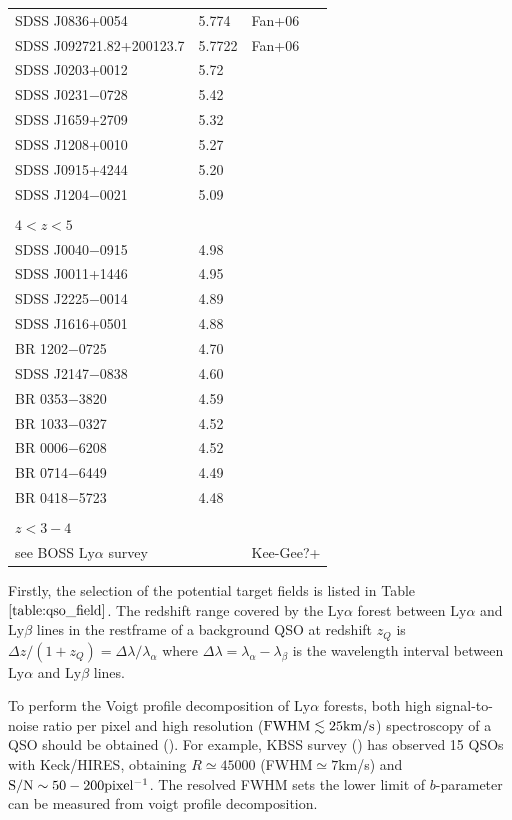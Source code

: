 \documentclass[useAMS,usenatbib,twocolumn]{mn2e}
\newcommand{\LyA}{\mbox{Ly}\alpha}
\begin{document}
\begin{table}
\begin{tabular}{lll}
SDSS J0836+0054                   &  5.774        & Fan+06  \\
SDSS J092721.82+200123.7          &  5.7722       & Fan+06  \\
SDSS J0203+0012  & 5.72 \\
SDSS J0231−0728  & 5.42 \\ 
SDSS J1659+2709  & 5.32 \\
SDSS J1208+0010  & 5.27 \\
SDSS J0915+4244  & 5.20 \\
SDSS J1204−0021  & 5.09 \\
\\
$4<z<5$ \\
SDSS J0040−0915  & 4.98\\
SDSS J0011+1446  & 4.95\\
SDSS J2225−0014  & 4.89\\
SDSS J1616+0501  & 4.88\\
BR 1202−0725     & 4.70\\
SDSS J2147−0838  & 4.60\\
BR 0353−3820     & 4.59\\
BR 1033−0327     & 4.52\\
BR 0006−6208     & 4.52\\
BR 0714−6449     & 4.49\\
BR 0418−5723     & 4.48\\
\\
$z<3-4$ \\
see BOSS $\LyA$ survey & & Kee-Gee?+ \\
  \hline
\end{tabular}

\end{table}

Firstly, the selection of the potential target fields is listed in
Table $\ref{table:qso_field}$. The redshift range covered by the $\LyA$ 
forest between $\LyA$ and $\mbox{Ly}\beta$ lines in the restframe of a 
background QSO at redshift $z_Q$ is $\Delta z/(1+z_Q)=\Delta\lambda/
\lambda_\alpha$ where $\Delta\lambda=\lambda_\alpha-\lambda_\beta$ is the 
wavelength interval between $\LyA$ and $\mbox{Ly}\beta$ lines.

To perform the Voigt profile decomposition of $\LyA$ forests, both high 
signal-to-noise ratio per pixel and high resolution ($\rm{FWHM\lesssim25km/s}$)
spectroscopy of a QSO should be obtained (\citealt{1998ARA&A..36..267R}). 
For example, KBSS survey (\citealt{2012ApJ...750...67R}) has observed 
15 QSOs with Keck/HIRES, obtaining $R\simeq45000$ 
(FWHM$\simeq 7$km/s) and $\rm{S/N\sim50-200pixel^{-1}}$. The resolved FWHM sets 
the lower limit of $b$-parameter can be measured from voigt profile 
decomposition. 
\end{document}
